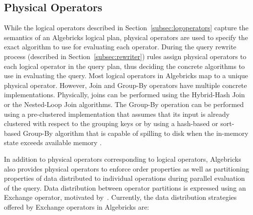 \subsection{Physical Operators}\label{subsec:phyoperators}

While the logical operators described in Section~\ref{subsec:logoperators} capture the semantics of an Algebricks logical plan, physical operators are used to specify the exact algorithm to use for evaluating each operator. 
During the query rewrite process (described in Section~\ref{subsec:rewriter}) rules assign physical operators to each logical operator in the query plan, thus deciding the concrete algorithms to use in evaluating the query. 
Most logical operators in Algebricks map to a unique physical operator. 
However, Join and Group-By operators have multiple concrete implementations. Physically, joins can be performed using the Hybrid-Hash Join~\cite{DeWitt:1984:ITM:602259.602261} or the Nested-Loop Join algorithms. 
The Group-By operation can be performed using a pre-clustered implementation that assumes that its input is already clustered with respect to the 
grouping keys or by using a hash-based or sort-based Group-By algorithm that is capable of spilling to disk when the in-memory state exceeds available memory \cite{WenBCT13}.

In addition to physical operators corresponding to logical operators, Algebricks also provides physical operators to enforce order properties as well as partitioning properties of data distributed to individual operations during parallel evaluation of the query. 
Data distribution between operator partitions is expressed using an Exchange operator, motivated by~\cite{exchange}. 
Currently, the data distribution strategies offered by Exchange operators in Algebricks are:

